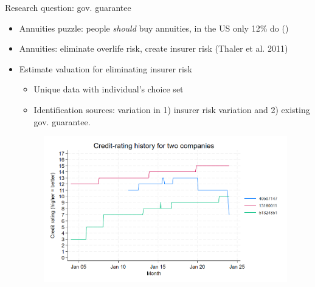 \documentclass[10pt,aspectratio=169]{beamer}
\begin{document}



\begin{frame}{Research question: gov. guarantee}
\begin{itemize}
    \item Annuities puzzle: people \textit{should} buy annuities, in the US only 12\% do (\cite{modigliani_life_1986})

    \item Annuities: eliminate overlife risk, create insurer risk (Thaler et al. 2011) %

    \item Estimate valuation for eliminating insurer risk
    \begin{itemize}
        \item Unique data with individual's choice set 
        \item Identification sources: variation in 1) insurer risk variation and 2) existing gov. guarantee.  
\end{itemize}

\begin{figure}
    \centering
    \includegraphics[width=0.5\linewidth]{../figures/credit_history.png}
    \label{fig:enter-label}
\end{figure}

  \end{itemize}
 
\end{frame}
\end{document}
